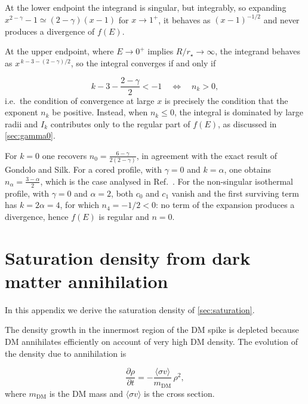 At the lower endpoint the integrand is singular, but integrably, so
expanding $x^{2-\gamma}-1 \simeq (2-\gamma)(x-1)$ for $x \to 1^{+}$, it
behaves as $(x-1)^{-1/2}$ and never produces a divergence of $f(E)$.

At the upper endpoint, where $E \to 0^{+}$ implies $R/r_\star \to \infty$,
the integrand behaves as $x^{\,k-3-(2-\gamma)/2}$, so the integral
converges if and only if

\begin{equation} \label{eq:app_conv}
k - 3 - \frac{2-\gamma}{2} < -1
\quad \Longleftrightarrow \quad
n_k > 0 ,
\end{equation}
i.e.\ the condition of convergence at large $x$ is precisely the condition
that the exponent $n_k$ be positive.
Instead, when $n_k \le 0$, the
integral is dominated by large radii and $I_k$
contributes only to the regular part
of $f(E)$, as discussed in \cref{sec:gamma0}.


For $k = 0$ one recovers $n_0 = \frac{6-\gamma}{2(2-\gamma)}$, in agreement with the exact result of
Gondolo and Silk.
For a cored profile, with $\gamma = 0$ and $k = \alpha$, one obtains $n_\alpha = \frac{3-\alpha}{2}$, 
which is the case analysed in Ref.~\cite{Ullio_2001}.
For the non-singular isothermal
profile, with $\gamma = 0$ and $\alpha = 2$, both $c_0$ and $c_1$ vanish
and the first surviving term has $k = 2\alpha = 4$, for which
$n_4 = -1/2 < 0$: no term of the expansion produces a divergence, hence
$f(E)$ is regular and $n = 0$.






\chapter{Saturation density from dark matter annihilation}
\label{app:saturation}

In this appendix we derive the saturation density of \cref{sec:saturation}.

The density
growth in the innermost region of the DM spike is depleted because DM annihilates efficiently
on account of very high DM density. The evolution of the density due to annihilation is

\begin{equation}
    \frac{\partial \rho}{\partial t} = -\frac{\langle\sigma v\rangle}{m_{\mathrm{DM}}}\,\rho^2,
    \label{eq:app_evolution}
\end{equation}
where $m_{\mathrm{DM}}$ is the DM mass and $\langle\sigma v\rangle$ is the cross section.

